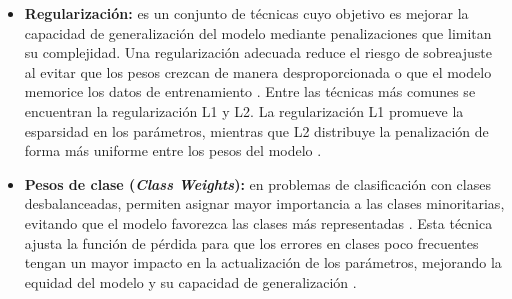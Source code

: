 \begin{itemize}
		\item \textbf{Regularización:} es un conjunto de técnicas cuyo objetivo es mejorar la capacidad de generalización del modelo mediante penalizaciones que limitan su complejidad. Una regularización adecuada reduce el riesgo de sobreajuste al evitar que los pesos crezcan de manera desproporcionada o que el modelo memorice los datos de entrenamiento \cite{bishop2006}. Entre las técnicas más comunes se encuentran la regularización L1 y L2. La regularización L1 promueve la esparsidad en los parámetros, mientras que L2 distribuye la penalización de forma más uniforme entre los pesos del modelo \cite{krogh1992, zhang2019}.
		
		\item \textbf{Pesos de clase (\textit{Class Weights}):} en problemas de clasificación con clases desbalanceadas, permiten asignar mayor importancia a las clases minoritarias, evitando que el modelo favorezca las clases más representadas \cite{he2009}. Esta técnica ajusta la función de pérdida para que los errores en clases poco frecuentes tengan un mayor impacto en la actualización de los parámetros, mejorando la equidad del modelo y su capacidad de generalización \cite{japkowicz2002}.
		
	\end{itemize}
	
	
	
	\small
	\renewcommand{\arraystretch}{1.2}
	

